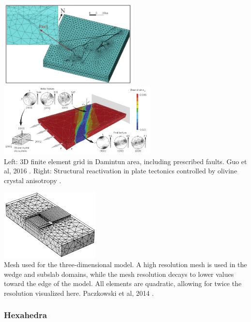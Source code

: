 \begin{center}
\includegraphics[width=7cm]{images/meshes/guyr16}
\includegraphics[width=8cm]{images/meshes/tokv09}\\
{\captionfont Left: 3D finite element grid in Damintun area, including prescribed faults. Guo et al, 2016 \cite{guyr16}.
Right: Structural reactivation in plate tectonics controlled by olivine crystal anisotropy \cite{tokv09}.}
\end{center}



\begin{center}
\includegraphics[width=5cm]{images/meshes/paml14b}\\
{\captionfont Mesh used for the three-dimensional model. A high resolution mesh is used in
the wedge and subslab domains, while the mesh resolution decays to lower values
toward the edge of the model. All elements are quadratic, allowing for twice the
resolution visualized here. Paczkowski et al, 2014 \cite{paml14b}.}
\end{center}

\subsubsection{Hexahedra}

